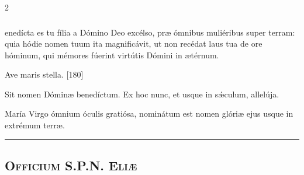 \documentclass[9pt,twoside]{extarticle}
\begin{document}
\begin{multicols}{2}
\subsubsection*{}
enedícta es tu fília a Dómino Deo excélso, præ ómnibus muliéribus super terram: quia hódie nomen tuum ita magnificávit, ut non recédat laus tua de ore hóminum, qui mémores fúerint virtútis Dómini in ætérnum.

\begin{tightlist}{}
\item {} Ave maris stella. [180]
\item {} Sit nomen Dóminæ benedíctum.  Ex hoc nunc, et usque in sǽculum, allelúja.
\item {} María Virgo ómnium óculis gratiósa, nominátum est nomen glóriæ ejus usque in extrémum terræ.
\end{tightlist}


\begin{center}\textcolor{red}{\rule{\linewidth}{0.5pt}} \end{center}
\clearpage
\subsection*{\center {}}
\subsubsection*{\center {}}

\subsection*{\center \textsc{Officium S.P.N. Eliæ}}

\end{multicols}
\end{document}
